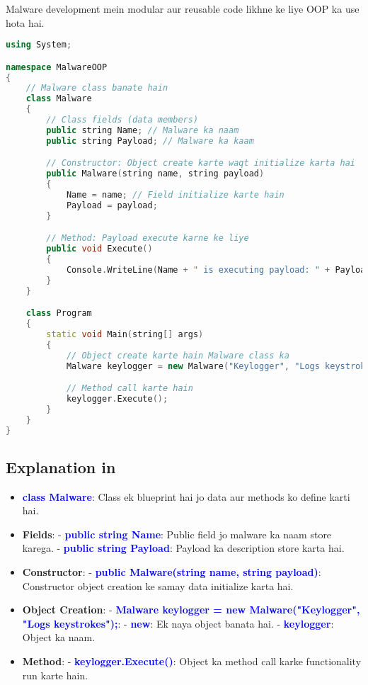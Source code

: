 \documentclass[12pt]{article}
\begin{document}
Malware development mein modular aur reusable code likhne ke liye OOP ka use hota hai.

\begin{lstlisting}[language=C++, caption=OOP Basics in C#]
using System;

namespace MalwareOOP
{
    // Malware class banate hain
    class Malware
    {
        // Class fields (data members)
        public string Name; // Malware ka naam
        public string Payload; // Malware ka kaam

        // Constructor: Object create karte waqt initialize karta hai
        public Malware(string name, string payload)
        {
            Name = name; // Field initialize karte hain
            Payload = payload;
        }

        // Method: Payload execute karne ke liye
        public void Execute()
        {
            Console.WriteLine(Name + " is executing payload: " + Payload);
        }
    }

    class Program
    {
        static void Main(string[] args)
        {
            // Object create karte hain Malware class ka
            Malware keylogger = new Malware("Keylogger", "Logs keystrokes");

            // Method call karte hain
            keylogger.Execute();
        }
    }
}
\end{lstlisting}

\subsection*{Explanation in  }

\begin{itemize}
    \item \textbf{\textcolor{blue}{class Malware}}: Class ek blueprint hai jo data aur methods ko define karti hai.
    \item \textbf{Fields}:  
    - \textbf{\textcolor{blue}{public string Name}}: Public field jo malware ka naam store karega.  
    - \textbf{\textcolor{blue}{public string Payload}}: Payload ka description store karta hai.
    \item \textbf{Constructor}:  
    - \textbf{\textcolor{blue}{public Malware(string name, string payload)}}: Constructor object creation ke samay data initialize karta hai.
    \item \textbf{Object Creation}:  
    - \textbf{\textcolor{blue}{Malware keylogger = new Malware("Keylogger", "Logs keystrokes");}}:  
      - \textbf{\textcolor{blue}{new}}: Ek naya object banata hai.  
      - \textbf{\textcolor{blue}{keylogger}}: Object ka naam.
    \item \textbf{Method}:  
    - \textbf{\textcolor{blue}{keylogger.Execute()}}: Object ka method call karke functionality run karte hain.
\end{itemize}
\end{document}
